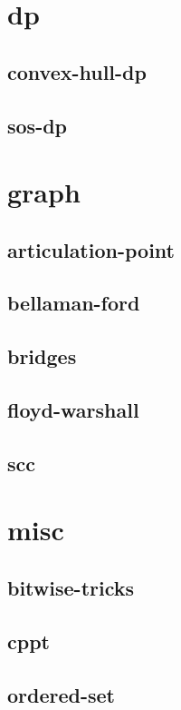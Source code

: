 \documentclass[a4paper, twocolumn]{article}
\begin{document}
\section{dp}
\subsection{convex-hull-dp}

\subsection{sos-dp}

\section{graph}
\subsection{articulation-point}

\subsection{bellaman-ford}

\subsection{bridges}

\subsection{floyd-warshall}

\subsection{scc}

\section{misc}
\subsection{bitwise-tricks}

\subsection{cppt}

\subsection{ordered-set}

\end{document}
